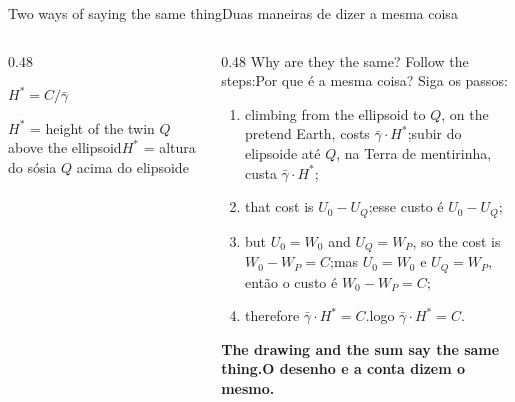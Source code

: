 \documentclass[aspectratio=169,11pt]{beamer}
\newcommand{\tr}[2]{\ifEN#2\else#1\fi}
\newcommand{\bnum}[1]{\textbf{\textcolor{mTeal}{#1}}}
\begin{document}
\begin{frame}{\tr{Duas maneiras de dizer a mesma coisa}{Two ways of saying the same thing}}
  \begin{columns}[T]
    \begin{column}{0.48\textwidth}
      \begin{regra}[title={\tr{Jeito 1 · a conta}{Way 1 · the sum}}]
        \centering $H^{*} = C / \bar\gamma$
      \end{regra}
      \medskip
      \begin{regra}[title={\tr{Jeito 2 · o desenho}{Way 2 · the drawing}}]
        \centering \tr{$H^{*}$ = altura do sósia $Q$ acima do elipsoide}{$H^{*}$ = height of
        the twin $Q$ above the ellipsoid}
      \end{regra}
    \end{column}
    \begin{column}{0.48\textwidth}
      \tr{Por que é a mesma coisa? Siga os passos:}{Why are they the same? Follow the steps:}
      \begin{enumerate}
        \setlength{\itemsep}{3pt}
        \item \tr{subir do elipsoide até $Q$, na Terra de mentirinha, custa $\bar\gamma \cdot
              H^{*}$;}{climbing from the ellipsoid to $Q$, on the pretend Earth, costs
              $\bar\gamma \cdot H^{*}$;}
        \item \tr{esse custo é $U_0 - U_Q$;}{that cost is $U_0 - U_Q$;}
        \item \tr{mas $U_0 = W_0$ e $U_Q = W_P$, então o custo é $W_0 - W_P = C$;}{but
              $U_0 = W_0$ and $U_Q = W_P$, so the cost is $W_0 - W_P = C$;}
        \item \tr{logo $\bar\gamma \cdot H^{*} = C$.}{therefore $\bar\gamma \cdot H^{*} = C$.}
      \end{enumerate}
      \medskip
      \tr{\bnum{O desenho e a conta dizem o mesmo.}}{\bnum{The drawing and the sum say the same
      thing.}}
    \end{column}
  \end{columns}
\end{frame}
\end{document}
